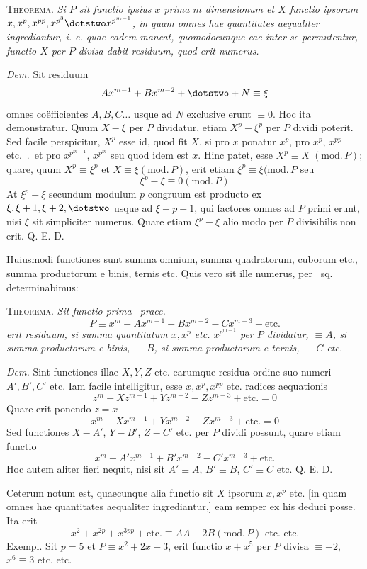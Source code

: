 \textsc{Theorema.} \emph{Si $P$ sit functio ipsius $x$ prima $m$ dimensionum et $X$ functio ipsorum $x,x^p,x^{pp},x^{p^3}\dotstwo x^{p^{m-1}}$, in quam omnes hae quantitates aequaliter ingrediantur, i. e. quae eadem maneat, quomodocunque eae inter se permutentur, functio $X$ per $P$ divisa dabit residuum, quod erit numerus.}

\emph{Dem.} Sit residuum
\[
Ax^{m-1}+Bx^{m-2}+\dotstwo+N\equiv\xi
\]
omnes coëfficientes $A,B,C\ldots$ usque ad $N$ exclusive erunt $\equiv0$. Hoc ita demonstratur. Quum $X-\xi$ per $P$ dividatur, etiam $X^p-\xi^p$ per $P$ dividi 
poterit. Sed facile perspicitur, $X^p$ esse id, quod fit $X$, si pro $x$ ponatur $x^p$, pro $x^p$, $x^{pp}$ etc.\ .\ et pro $x^{p^{m-1}}$, $x^{p^m}$ seu quod idem est $x$. Hinc patet, esse $X^p\equiv X\;(\mathrm{mod.}\,P)$; quare, quum $X^p\equiv\xi^p$ et $X\equiv\xi(\mathrm{mod.}\,P)$, erit etiam $\xi^p\equiv\xi(\mathrm{mod.}\,P$ seu
\[
\xi^p-\xi\equiv0(\mathrm{mod.}\,P)
\]
At $\xi^p-\xi$ secundum modulum $p$ congruum est producto ex $\xi,\xi+1,\xi+2,\dotstwo$ usque ad $\xi+p-1$, qui factores omnes ad $P$ primi erunt, nisi $\xi$ sit simpliciter numerus. Quare etiam $\xi^p-\xi$ alio modo per $P$ divisibilis non erit. Q. E. D.

Huiusmodi functiones sunt summa omnium, summa quadratorum, cuborum etc., summa productorum e binis, ternis etc. Quis vero sit ille numerus, per \textsection\ sq. determinabimus:

\textsc{Theorema.} \emph{Sit functio prima \textsection\ praec.}
\[
P\equiv x^m-Ax^{m-1}+Bx^{m-2}-Cx^{m-3}+\text{etc.}
\]
\emph{erit residuum, si summa quantitatum $x,x^p$ etc. $x^{p^{m-1}}$ per $P$ dividatur, $\equiv A$, si summa productorum e binis, $\equiv B$, si summa productorum e ternis, $\equiv C$ etc.}

\emph{Dem.} Sint functiones illae $X,Y,Z$ etc. earumque residua ordine suo numeri $A',B',C'$ etc. Iam facile intelligitur, esse $x,x^p,x^{pp}$ etc. radices aequationis
\[
z^m-Xz^{m-1}+Yz^{m-2}-Zz^{m-3}+\text{etc.}=0
\]
Quare erit ponendo $z=x$
\[
x^m-Xx^{m-1}+Yx^{m-2}-Zx^{m-3}+\text{etc.}=0
\]
Sed functiones $X-A'$, $Y-B'$, $Z-C'$ etc. per $P$ dividi possunt, quare etiam functio
\[
x^m-A'x^{m-1}+B'x^{m-2}-C'x^{m-3}+\text{etc.}
\]
Hoc autem aliter fieri nequit, nisi sit $A'\equiv A$, $B'\equiv B$, $C'\equiv C$ etc. Q. E. D.

Ceterum notum est, quaecunque alia functio sit $X$ ipsorum $x,x^p$ etc. [in quam omnes hae quantitates aequaliter ingrediantur,] eam semper ex his deduci posse. Ita erit
\[
x^2+x^{2p}+x^{3pp}+\text{etc.}\equiv AA-2B(\mathrm{mod.}\,P)\text{ etc. etc.}
\]
Exempl. Sit $p=5$ et $P\equiv x^2+2x+3$, erit functio $x+x^5$ per $P$ divisa $\equiv-2$, $x^6\equiv3$ etc. etc.
